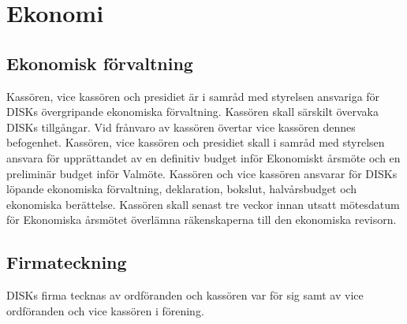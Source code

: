 \clearpage
\section{Ekonomi}
\label{sec:ekonomi}

	\subsection{Ekonomisk förvaltning}
	\label{subsec:ekonomiskforvaltning}
		Kassören, vice kassören och presidiet är i samråd med styrelsen ansvariga för DISKs övergripande ekonomiska förvaltning. Kassören skall särskilt övervaka DISKs tillgångar. Vid frånvaro av kassören övertar vice kassören dennes befogenhet. Kassören, vice kassören och presidiet skall i samråd med styrelsen ansvara för upprättandet av en definitiv budget inför Ekonomiskt årsmöte och en preliminär budget inför Valmöte. Kassören och vice kassören ansvarar för DISKs löpande ekonomiska förvaltning, deklaration, bokslut, halvårsbudget och ekonomiska berättelse. Kassören skall senast tre veckor innan utsatt mötesdatum för Ekonomiska årsmötet överlämna räkenskaperna till den ekonomiska revisorn.

	\subsection{Firmateckning}
	\label{subsec:formateckning}
		DISKs firma tecknas av ordföranden och kassören var för sig samt av vice ordföranden och vice kassören i förening.
